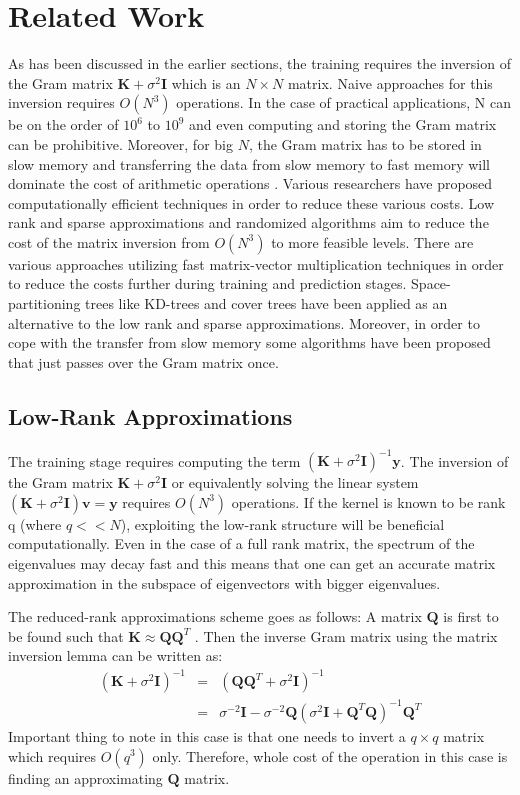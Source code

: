 \documentclass{article}
\begin{document}
\section{Related Work}
As has been discussed in the earlier sections, the training requires the inversion of the Gram matrix $\mathbf{K}+\sigma^2\mathbf{I}$ which is an $N\times N$ matrix. Naive approaches for this inversion requires $O(N^3)$ operations. In the case of practical applications, N can be on the order of $10^6$ to $10^9$ and even computing and storing the Gram matrix can be prohibitive. Moreover, for big $N$, the Gram matrix has to be stored in slow memory and transferring the data from slow memory to fast memory will dominate the cost of arithmetic operations \cite{RandomizedMatrixDecompose}.  Various researchers have proposed computationally efficient techniques in order to reduce these various costs. Low rank and sparse approximations and randomized algorithms aim to reduce the cost of the matrix inversion from $O(N^3)$ to more feasible levels. There are various approaches utilizing fast matrix-vector multiplication techniques in order to reduce the costs further during training and prediction stages. Space-partitioning trees like KD-trees and cover trees have been applied as an alternative to the low rank and sparse approximations. Moreover, in order to cope with the transfer from slow memory some algorithms have been proposed that just passes over the Gram matrix once.
\subsection{Low-Rank Approximations}
The training stage requires computing the term $(\mathbf{K}+\sigma^2\mathbf{I})^{-1}\mathbf{y}$. The inversion of the Gram matrix $\mathbf{K}+\sigma^2\mathbf{I}$ or equivalently solving the linear system $(\mathbf{K}+\sigma^2\mathbf{I})\mathbf{v}=\mathbf{y}$ requires $O(N^3)$ operations. If the kernel is known to be rank q (where $q<<N$), exploiting the low-rank structure will be beneficial computationally. Even in the case of a full rank matrix, the spectrum of the eigenvalues may decay fast and this means that one can get an accurate matrix approximation in the subspace of eigenvectors with bigger eigenvalues. 

The reduced-rank approximations scheme goes as follows: A matrix $\mathbf{Q}$ is first to be found such that $\mathbf{K} \approx \mathbf{Q}\mathbf{Q}^T$ . Then the inverse Gram matrix using the matrix inversion lemma can be written as:
\begin{eqnarray}
(\mathbf{K}+\sigma^2\mathbf{I})^{-1}&=&(\mathbf{Q}\mathbf{Q}^T+\sigma^2\mathbf{I})^{-1} \nonumber \\
&=&\sigma^{-2}\mathbf{I}-\sigma^{-2}\mathbf{Q}(\sigma^2\mathbf{I}+\mathbf{Q}^T\mathbf{Q})^{-1}\mathbf{Q}^T
\end{eqnarray}
Important thing to note in this case is that one needs to invert a $q \times q$ matrix which requires $O(q^3)$ only. Therefore, whole cost of the operation in this case is finding an approximating $\mathbf{Q}$ matrix.
\end{document}
